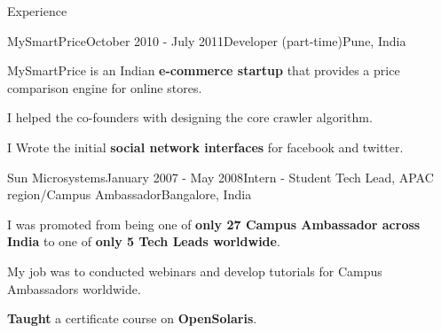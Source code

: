 \documentclass{resume} %
\begin{document}
\begin{rSection}{Experience}
\begin{rSubsection}{MySmartPrice}{October 2010 - July 2011}{Developer (part-time)}{Pune, India}
\item MySmartPrice is an Indian \textbf{e-commerce startup} that provides a price comparison engine for online stores. 
\begin{lsubSubsection}
\item I helped the co-founders with designing the core crawler algorithm. 
\item I Wrote the initial \textbf{social network interfaces} for facebook and twitter.
\end{lsubSubsection}
\end{rSubsection}

\begin{rSubsection}{Sun Microsystems}{January 2007 - May 2008}{Intern - Student Tech Lead, APAC region/Campus Ambassador}{Bangalore, India}
\item I was promoted from being one of \textbf{only 27 Campus Ambassador across India} to one of \textbf{only 5 Tech Leads worldwide}.
\begin{lsubSubsection}
\item My job was to conducted webinars and develop tutorials for Campus Ambassadors worldwide.
\item \textbf{Taught} a certificate course on \textbf{OpenSolaris}.
\end{lsubSubsection}
\end{rSubsection}
\end{rSection}
\end{document}
